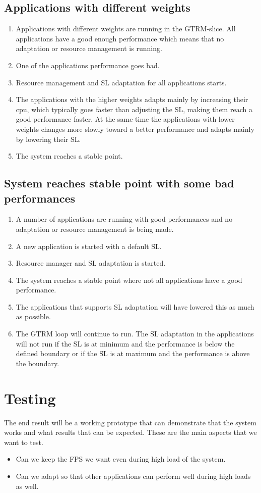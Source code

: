 \documentclass[nobiblatex]{LTHthesis}
\begin{document}
\section{Applications with different weights}
\begin{enumerate}
\item Applications with different weights are running in the GTRM-slice. All applications have a good enough performance which means that no adaptation or resource management is running. 
\item One of the applications performance goes bad.
\item Resource management and SL adaptation for all applications starts.
\item The applications with the higher weights adapts mainly by increasing their cpu, which typically goes faster than adjusting the SL, making them reach a good performance faster. At the same time the applications with lower weights changes more slowly toward a better performance and adapts mainly by lowering their SL.
\item The system reaches a stable point.
\end{enumerate}

\section{System reaches stable point with some bad performances}
\begin{enumerate}
\item A number of applications are running with good performances and no adaptation or resource management is being made.
\item A new application is started with a default SL.
\item Resource manager and SL adaptation is started.
\item The system reaches a stable point where not all applications have a good performance. 
\item The applications that supports SL adaptation will have lowered this as much as possible.
\item The GTRM loop will continue to run. The SL adaptation in the applications will not run if the SL is at minimum and the performance is below the defined boundary or if the SL is at maximum and the performance is above the boundary.
\end{enumerate}

\chapter{Testing}
The end result will be a working prototype that can demonstrate that the system works and what results that can be expected. These are the main aspects that we want to test.
\begin{itemize}
\item Can we keep the FPS we want even during high load of the system.
\item Can we adapt so that other applications can perform well during high loads as well. 
\end{itemize}
\end{document}
